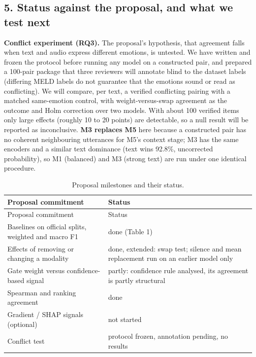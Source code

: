 \documentclass[
  10pt,
]{article}
\begin{document}
\subsection{5. Status against the proposal, and what we test
next}\label{status-against-the-proposal-and-what-we-test-next}

\textbf{Conflict experiment (RQ3).} The proposal's hypothesis, that
agreement falls when text and audio express different emotions, is
untested. We have written and frozen the protocol before running any
model on a constructed pair, and prepared a 100-pair package that three
reviewers will annotate blind to the dataset labels (differing MELD
labels do not guarantee that the emotions sound or read as conflicting).
We will compare, per text, a verified conflicting pairing with a matched
same-emotion control, with weight-versus-swap agreement as the outcome
and Holm correction over two models. With about 100 verified items only
large effects (roughly 10 to 20 points) are detectable, so a null result
will be reported as inconclusive. \textbf{M3 replaces M5} here because a
constructed pair has no coherent neighbouring utterances for M5's
context stage; M3 has the same encoders and a similar text dominance
(text wins 92.8\%, uncorrected probability), so M1 (balanced) and M3
(strong text) are run under one identical procedure.

\begin{longtable}[]{@{}
  >{\raggedright\arraybackslash}p{}
  >{\raggedright\arraybackslash}p{}@{}}
\caption{Proposal milestones and their status.}\tabularnewline
\toprule\noalign{}
\begin{minipage}[b]{\linewidth}\raggedright
Proposal commitment
\end{minipage} & \begin{minipage}[b]{\linewidth}\raggedright
Status
\end{minipage} \\
\midrule\noalign{}
\endfirsthead
\toprule\noalign{}
\begin{minipage}[b]{\linewidth}\raggedright
Proposal commitment
\end{minipage} & \begin{minipage}[b]{\linewidth}\raggedright
Status
\end{minipage} \\
\midrule\noalign{}
\endhead
\bottomrule\noalign{}
\endlastfoot
Baselines on official splits, weighted and macro F1 & done (Table 1) \\
Effects of removing or changing a modality & done, extended: swap test;
silence and mean replacement run on an earlier model only \\
Gate weight versus confidence-based signal & partly: confidence rule
analysed, its agreement is partly structural \\
Spearman and ranking agreement & done \\
Gradient / SHAP signals (optional) & not started \\
Conflict test & protocol frozen, annotation pending, no results \\
\end{longtable}
\end{document}

